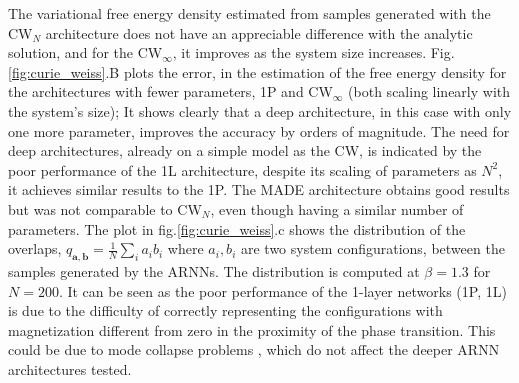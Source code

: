 \documentclass[aps,physrev,10pt,floatfix,reprint]{revtex4-2}
\begin{document}
The variational free energy density estimated from samples generated with the CW$_N$ architecture does not have an appreciable difference with the analytic solution, and for the CW$_{\infty}$, it improves as the system size increases. Fig.\ref{fig:curie_weiss}.B plots the error, in the estimation of the free energy density for the architectures with fewer parameters, 1P and CW$_{\infty}$ (both scaling linearly with the system's size); It shows clearly that a deep architecture, in this case with only one more parameter, improves the accuracy by orders of magnitude. The need for deep architectures, already on a simple model as the CW, is indicated by the poor performance of the 1L architecture, despite its scaling of parameters as $N^2$, it achieves similar results to the 1P. The MADE architecture obtains good results but was not comparable to CW$_N$, even though having a similar number of parameters. The plot in fig.\ref{fig:curie_weiss}.c shows the distribution of the overlaps, $q_{\mathbf{a}, \mathbf{b}}=\frac{1}{N}\sum_{i} a_i b_i$ where $a_i, b_i$ are two system configurations, between the samples generated by the ARNNs. The distribution is computed at $\beta=1.3$ for $N=200$. It can be seen as the poor performance of the 1-layer networks (1P, 1L) is due to the difficulty of correctly representing the configurations with magnetization different from zero in the proximity of the phase transition. This could be due to mode collapse problems \cite{https://doi.org/10.48550/arxiv.2210.11145}, which do not affect the deeper ARNN architectures tested.
\end{document}
